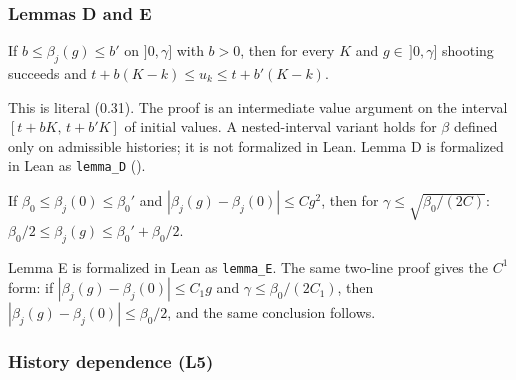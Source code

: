 \subsubsection{Lemmas D and E}\label{sec:DE}

\begin{lemma}[Lemma D]\label{lem:L006}
If $b\le\beta_j(g)\le b'$ on $]0,\gamma]$ with $b>0$, then for every $K$ and $g\in\,]0,\gamma]$ shooting succeeds and $t+b(K-k)\le u_k\le t+b'(K-k)$.
\end{lemma}
This is literal (0.31). The proof is an intermediate value argument on the interval $[t+bK,\,t+b'K]$ of initial values. A nested-interval variant holds for $\beta$ defined only on admissible histories; it is not formalized in Lean. Lemma D is formalized in Lean as \texttt{lemma\_D} ().

\begin{lemma}[Lemma E]\label{lem:L007}
If $\beta_0\le\beta_j(0)\le\beta_0'$ and $|\beta_j(g)-\beta_j(0)|\le Cg^2$, then for $\gamma\le\sqrt{\beta_0/(2C)}$: $\beta_0/2\le\beta_j(g)\le\beta_0'+\beta_0/2$.
\end{lemma}
Lemma E is formalized in Lean as \texttt{lemma\_E}. The same two-line proof gives the $C^1$ form: if $|\beta_j(g)-\beta_j(0)|\le C_1g$ and $\gamma\le\beta_0/(2C_1)$, then $|\beta_j(g)-\beta_j(0)|\le\beta_0/2$, and the same conclusion follows.

\subsubsection{History dependence (L5)}\label{sec:L5}

